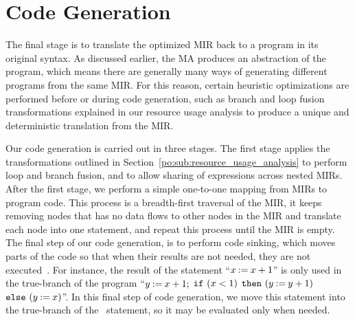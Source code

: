 \section{Code Generation}
\label{po:sec:code_generation}

The final stage is to translate the optimized MIR back to a program in its
original syntax.  As discussed earlier, the MA produces an abstraction of the
program, which means there are generally many ways of generating different
programs from the same MIR\@.  For this reason, certain heuristic optimizations
are performed before or during code generation, such as branch and loop fusion
transformations explained in our resource usage analysis to produce a unique
and deterministic translation from the MIR\@.

Our code generation is carried out in three stages.  The first stage applies
the transformations outlined in Section~\ref{po:sub:resource_usage_analysis}
to perform loop and branch fusion, and to allow sharing of expressions
across nested MIRs. After the first stage, we perform a simple one-to-one
mapping from MIRs to program code.  This process is a breadth-first traversal
of the MIR, it keeps removing nodes that has no data flows to other nodes
in the MIR and translate each node into one statement, and repeat this
process until the MIR is empty.  The final step of our code generation, is
to perform code sinking, which moves parts of the code so that when their
results are not needed, they are not executed~\cite{llvm}.  For instance,
the result of the statement ``$x\mathbin{:=}{x + 1}$'' is only used in the
true-branch of the program ``$y\mathbin{:=}{x + 1} \mathbin{;}$ $\texttt{if}~(x <
1)$ $\texttt{then}~(y\mathbin{:=}{y + 1})$ $\texttt{else}~(y\mathbin{:=}{x})$''.  In
this final step of code generation, we move this statement into the true-branch
of the \iflit~statement, so it may be evaluated only when needed.
